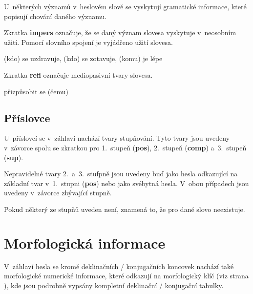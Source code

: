 U~některých významů v~heslovém slově se vyskytují gramatické informace, které popisují chování daného významu.

Zkratka \textbf{impers} označuje, že se daný význam slovesa vyskytuje v~neosobním užití. Pomocí slovního spojení je vyjádřeno užití slovesa.

\blspace
  \dicEntry {}     (kdo) se uzdravuje, (kdo) se zotavuje, (komu) je lépe
\blspace

Zkratka \textbf{refl} označuje mediopasivní tvary slovesa.

\blspace
  \dicEntry {}    {}  {přizpůsobit se (čemu)}
\blspace

\subsection*{Příslovce}

U~příslovcí se v~záhlaví nachází tvary stupňování. Tyto tvary jsou uvedeny v~závorce spolu se zkratkou pro 1.~stupeň (\textbf{pos}), 2.~stupeň (\textbf{comp}) a~3.~stupeň (\textbf{sup}).

\blspace
  \dicEntry {}  
\blspace

Nepravidelné tvary 2.~a~3.~stufpně jsou uvedeny buď jako hesla odkazující na základní tvar v~1.~stupni (\textbf{pos}) nebo jako svébytná hesla. V~obou případech jsou uvedeny v~závorce zbývající stupně.

\blspace
  \dicEntry {}  
\blspace

Pokud některý ze stupňů uveden není, znamená to, že pro dané slovo neexistuje.

\blspace
  \dicEntry {}  
\blspace

\section{Morfologická informace} \label{sec:dec}

V~záhlaví hesla se kromě deklinačních / konjugačních koncovek nachází také morfologické numerické informace, které odkazují na morfologický klíč (viz strana \pageref{sec:morpho}), kde jsou podrobně vypsány kompletní deklinační / konjugační tabulky.

